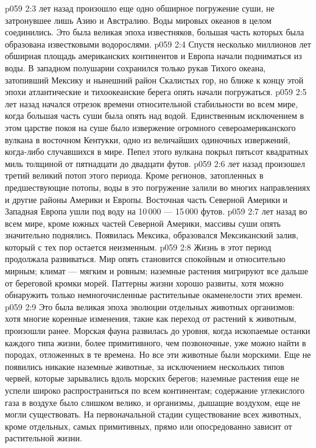 \vs p059 2:3 \pc {} лет назад произошло еще одно обширное погружение суши, не затронувшее лишь Азию и Австралию. Воды мировых океанов в целом соединились. Это была великая эпоха известняков, большая часть которых была образована известковыми водорослями.
\vs p059 2:4 Спустя несколько миллионов лет обширная площадь американских континентов и Европа начали подниматься из воды. В западном полушарии сохранился только рукав Тихого океана, затопивший Мексику и нынешний район Скалистых гор, но ближе к концу этой эпохи атлантические и тихоокеанские берега опять начали погружаться.
\vs p059 2:5 \pc {} лет назад начался отрезок времени относительной стабильности во всем мире, когда большая часть суши была опять над водой. Единственным исключением в этом царстве покоя на суше было извержение огромного североамериканского вулкана в восточном Кентукки, одно из величайших одиночных извержений, когда\hyp{}либо случавшихся в мире. Пепел этого вулкана покрыл пятьсот квадратных миль толщиной от пятнадцати до двадцати футов.
\vs p059 2:6 \pc {} лет назад произошел третий великий потоп этого периода. Кроме регионов, затопленных в предшествующие потопы, воды в это погружение залили во многих направлениях и другие районы Америки и Европы. Восточная часть Северной Америки и Западная Европа ушли под воду на 10\,000 --- 15\,000 футов.
\vs p059 2:7 \pc {} лет назад во всем мире, кроме южных частей Северной Америки, массивы суши опять значительно поднялись. Появилась Мексика, образовался Мексиканский залив, который с тех пор остается неизменным.
\vs p059 2:8 Жизнь в этот период продолжала развиваться. Мир опять становится спокойным и относительно мирным; климат --- мягким и ровным; наземные растения мигрируют все дальше от береговой кромки морей. Паттерны жизни хорошо развиты, хотя можно обнаружить только немногочисленные растительные окаменелости этих времен.
\vs p059 2:9 \pc Это была великая эпоха эволюции отдельных животных организмов: хотя многие коренные изменения, такие как переход от растений к животным, произошли ранее. Морская фауна развилась до уровня, когда ископаемые останки каждого типа жизни, более примитивного, чем позвоночные, уже можно найти в породах, отложенных в те времена. Но все эти животные были морскими. Еще не появились никакие наземные животные, за исключением нескольких типов червей, которые зарывались вдоль морских берегов; наземные растения еще не успели широко распространиться по всем континентам; содержание углекислого газа в воздухе было слишком велико, и организмы, дышащие воздухом, еще не могли существовать. На первоначальной стадии существование всех животных, кроме отдельных, самых примитивных, прямо или опосредованно зависит от растительной жизни.
